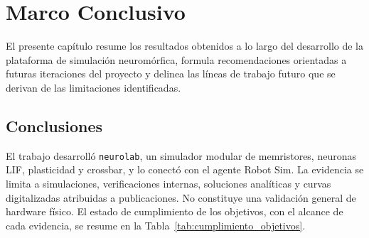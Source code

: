 \chapter{Marco Conclusivo}
\label{ch:marco_conclusivo}

El presente capítulo resume los resultados obtenidos a lo largo del desarrollo
de la plataforma de simulación neuromórfica, formula recomendaciones orientadas
a futuras iteraciones del proyecto y delinea las líneas de trabajo futuro que
se derivan de las limitaciones identificadas.

\section{Conclusiones}
\label{sec:conclusiones_principales}

El trabajo desarrolló \texttt{neurolab}, un simulador modular de
memristores, neuronas LIF, plasticidad y crossbar, y lo conectó con el
agente Robot Sim. La evidencia se limita a simulaciones, verificaciones
internas, soluciones analíticas y curvas digitalizadas atribuidas a
publicaciones. No constituye una validación general de hardware físico.
El estado de cumplimiento de los objetivos, con el alcance de cada
evidencia, se resume en la Tabla~\ref{tab:cumplimiento_objetivos}.

